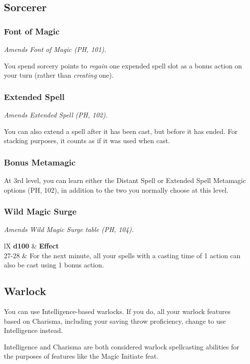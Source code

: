\documentclass[House_Rules.tex]{subfiles}
\begin{document}
\subsection{Sorcerer}

\subsubsection{Font of Magic}
\textit{Amends Font of Magic (PH, 101).}

You spend sorcery points to \textit{regain} one expended spell slot as a bonus action on your turn (rather than \textit{creating} one).

\subsubsection{Extended Spell}
\textit{Amends Extended Spell (PH, 102).}

You can also extend a spell after it has been cast, but before it has ended. For stacking purposes, it counts as if it was used when cast.

\subsubsection{Bonus Metamagic}
At 3rd level, you can learn either the Distant Spell or Extended Spell Metamagic options (PH, 102), in addition to the two you normally choose at this level.

\subsubsection{Wild Magic Surge}
\textit{Amends Wild Magic Surge table (PH, 104).}

\begin{DndTable}[]{lX}
    \textbf{d100} & \textbf{Effect} \\
    27-28 & For the next minute, all your spells with a casting time of 1 action can also be cast using 1 bonus action.
\end{DndTable}

\subsection{Warlock}

You can use Intelligence-based warlocks. If you do, all your warlock features based on Charisma, including your saving throw proficiency, change to use Intelligence instead.

Intelligence and Charisma are both considered warlock spellcasting abilities for the purposes of features like the Magic Initiate feat.
\end{document}
